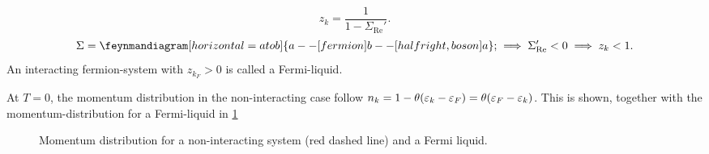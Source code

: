 \begin{equation} 
z_k = \frac{1}{1-\Sigma_{\text{Re}}'}.
\end{equation}
\begin{equation} 
\Sigma = \begin{gathered}
\feynmandiagram[horizontal=a to b]{a--[fermion] b --[half right, boson] a};
\end{gathered} \implies\Sigma_{\text{Re}}' <0 \implies z_k <1.
\end{equation}
An interacting fermion-system with $z_{k_F}>0$ is called a Fermi-liquid. 

At $T = 0$, the momentum distribution in the non-interacting case follow $n_k = 1-\theta(\varepsilon_k - \varepsilon_F) = \theta(\varepsilon_F-\varepsilon_k)$. This is shown, together with the momentum-distribution for a Fermi-liquid in \cref{fermi_liquid_occupation}
\begin{figure}
	\centering
	
	\caption{Momentum distribution for a non-interacting system (red dashed line) and a Fermi liquid.}
	\label{fermi_liquid_occupation}
\end{figure}

